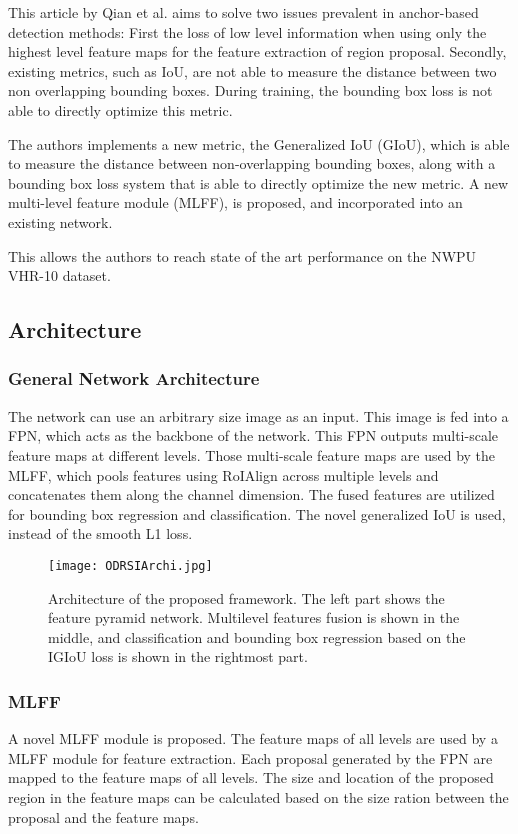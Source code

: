 
This article by Qian et al. aims to solve two issues prevalent in anchor-based detection methods:
First the loss of low level information when using only the highest level feature maps for the feature extraction of region proposal.
Secondly, existing metrics, such as IoU, are not able to measure the distance between two non overlapping bounding boxes. During training, the bounding box loss is not able to directly optimize this metric. 

The authors implements a new metric, the Generalized IoU (GIoU), which is able to measure the distance between non-overlapping bounding boxes, along with a bounding box loss system that is able to directly optimize the new metric. A new multi-level feature module (MLFF), is proposed, and incorporated into an existing network.

This allows the authors to reach state of the art performance on the NWPU VHR-10 dataset\cite{nwpu}.

\subsection{Architecture}
\subsubsection{General Network Architecture}
The network can use an arbitrary size image as an input. This image is fed into a FPN, which acts as the backbone of the network. This FPN outputs multi-scale feature maps at different levels. Those multi-scale feature maps are used by the MLFF, which pools features using RoIAlign\cite{resNet} across multiple levels and concatenates them along the channel dimension. The fused features are utilized for bounding box regression and classification. The novel generalized IoU is used, instead of the smooth L1 loss.


\begin{figure}[h!]
  \centering
  \texttt{[image: ODRSIArchi.jpg]}
	\caption[General Architecture of the ODRSI]{Architecture of the proposed framework. The left part shows the feature pyramid network. Multilevel features fusion is shown in the middle, and classification and bounding box regression based on the IGIoU loss is shown in the rightmost part.}
  \label{fig:archiQian}
\end{figure}

\subsubsection{MLFF}
A novel MLFF module is proposed. The feature maps of all levels are used by a MLFF module for feature extraction. Each proposal generated by the FPN are mapped to the feature maps of all levels. The size and location of the proposed region in the feature maps can be calculated based on the size ration between the proposal and the feature maps. 

